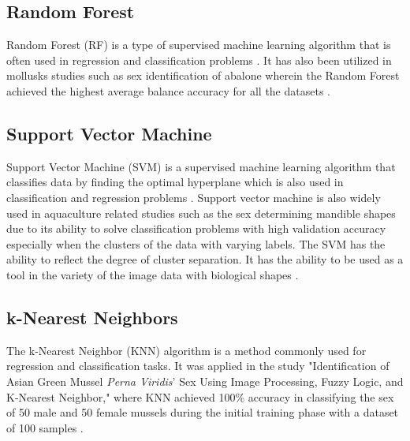 \subsection{Random Forest}

Random Forest (RF) is a type of supervised machine learning algorithm that is often used in regression and classification problems \cite{cui2020}. It has also been utilized in mollusks studies such as sex identification of abalone wherein the Random Forest achieved the highest average balance accuracy for all the datasets \cite{arifin2021}.

\subsection{Support Vector Machine}

Support Vector Machine (SVM) is a supervised machine learning algorithm that classifies data by finding the optimal hyperplane which is also used in classification and regression problems \cite{cui2020}. Support vector machine is also widely used in aquaculture related studies such as the sex determining mandible shapes due to its ability to solve classification problems with high validation accuracy especially when the clusters of the data with varying labels. The SVM has the ability to reflect the degree of cluster separation. It has the ability to be used as a tool in the variety of the image data with biological shapes \cite{tsutsumi2023}.

\subsection{k-Nearest Neighbors}
The k-Nearest Neighbor (KNN) algorithm is a method commonly used for regression and classification tasks. It was applied in the study "Identification of Asian Green Mussel \textit{Perna Viridis}' Sex Using Image Processing, Fuzzy Logic, and K-Nearest Neighbor," where KNN achieved 100\% accuracy in classifying the sex of 50 male and 50 female mussels during the initial training phase with a dataset of 100 samples \cite{magbayao2020}.

